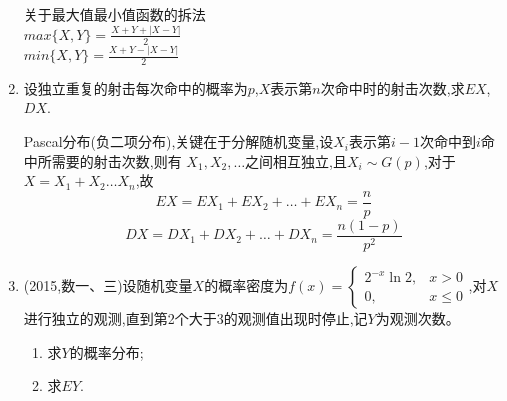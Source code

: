 \documentclass[12pt, a4paper, oneside, UTF8]{ctexbook}
\begin{document}
\begin{enumerate}[label=\arabic*.]
    \begin{tcolorbox}[title=总结]
        关于最大值最小值函数的拆法 \\
        $max\{X,Y\}=\frac{X+Y+|X-Y|}{2}$ \\
        $min\{X,Y\}=\frac{X+Y-|X-Y|}{2}$
    \end{tcolorbox}
    \item 设独立重复的射击每次命中的概率为$p$,$X$表示第$n$次命中时的射击次数,求$EX$,$DX$.
    
    \begin{solution}
    Pascal分布(负二项分布),关键在于{\color{red}分解随机变量},设$X_i$表示第$i-1$次命中到$i$命中所需要的射击次数,则有
    $X_1,X_2,\ldots$之间相互独立,且$X_i\sim G(p)$,对于$X=X_1+X_2\ldots X_n$,故
    \[
    EX=EX_1+EX_2+\ldots+EX_n=\frac{n}{p}
    \]
    \[
    DX=DX_1+DX_2+\ldots+DX_n=\frac{n(1-p)}{p^2}
    \]
    \end{solution}
    
    \item  (2015,数一、三)设随机变量$X$的概率密度为$f(x)=\begin{cases}2^{-x}\ln2, & x>0 \\ 0, & x\leq0\end{cases}$,对$X$进行独立的观测,直到第2个大于3的观测值出现时停止,记$Y$为观测次数。
    \begin{enumerate}
        \item 求$Y$的概率分布;
        \item 求$EY$.
    \end{enumerate}

\end{enumerate}
\end{document}
